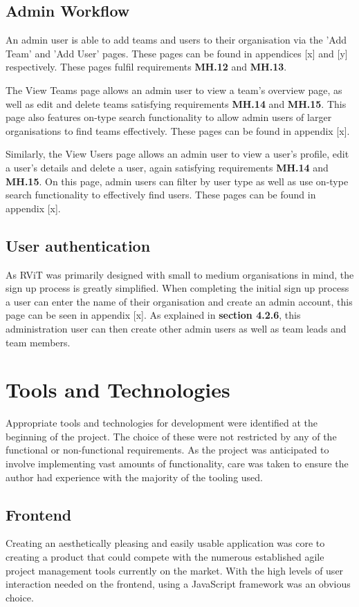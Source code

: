 \documentclass[l4proj.tex]{subfiles}
\begin{document}
\subsection{Admin Workflow}
An admin user is able to add teams and users to their organisation via the 'Add Team' and 'Add User' pages. These pages can be found in appendices [x] and [y] respectively. These pages fulfil requirements \textbf{MH.12} and \textbf{MH.13}.

The View Teams page allows an admin user to view a team's overview page, as well as edit and delete teams satisfying requirements \textbf{MH.14} and \textbf{MH.15}. This page also features on-type search functionality to allow admin users of larger organisations to find teams effectively. These pages can be found in appendix [x].

Similarly, the View Users page allows an admin user to view a user's profile, edit a user's details and delete a user, again satisfying requirements \textbf{MH.14} and \textbf{MH.15}. On this page, admin users can filter by user type as well as use on-type search functionality to effectively find users. These pages can be found in appendix [x].


\subsection{User authentication}
As RViT was primarily designed with small to medium organisations in mind, the sign up process is greatly simplified. When completing the initial sign up process a user can enter the name of their organisation and create an admin account, this page can be seen in appendix [x]. As explained in \textbf{section 4.2.6}, this administration user can then create other admin users as well as team leads and team members. 

\section{Tools and Technologies}
Appropriate tools and technologies for development were identified at the beginning of the project. The choice of these were not restricted by any of the functional or non-functional requirements. As the project was anticipated to involve implementing vast amounts of functionality, care was taken to ensure the author had experience with the majority of the tooling used. 

\subsection{Frontend}
Creating an aesthetically pleasing and easily usable application was core to creating a product that could compete with the numerous established agile project management tools currently on the market. With the high levels of user interaction needed on the frontend, using a JavaScript framework was an obvious choice. 
\end{document}
